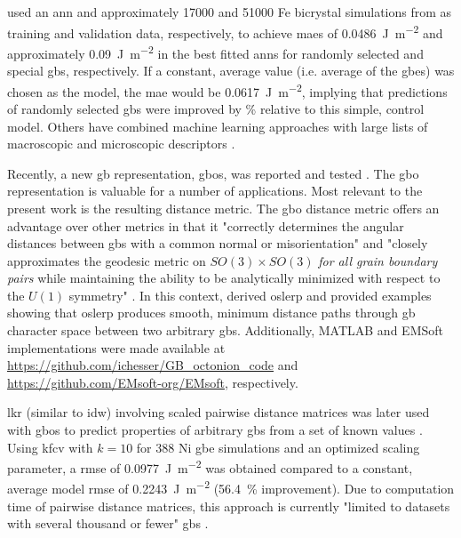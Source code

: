 \documentclass[final,twocolumn,12pt]{elsarticle}
\begin{document}
\citet{restrepoUsingArtificialNeural2014} used an \gls{ann} and approximately \num{17000} and \num{51000} Fe bicrystal simulations from \citet{kimIdentificationSchemeGrain2011} as training and validation data, respectively, to achieve \glspl{mae} of \SI{0.0486}{\J\per\square\m} and approximately \SI{0.09}{\J\per\square\m} in the best fitted \glspl{ann} for randomly selected and special \glspl{gb}, respectively. If a constant, average value (i.e. average of the \inpt{} \glspl{gbe}) was chosen as the model, the \gls{mae} would be \SI{0.0617}{\J\per\square\m}, implying that predictions of randomly selected \glspl{gb} were improved by \% relative to this simple, control model. Others have combined machine learning approaches with large lists of macroscopic and microscopic descriptors \cite{guziewskiMicroscopicMacroscopicCharacterization2021,huGeneticAlgorithmguidedDeep2020}.

Recently, a new \gls{gb} representation, \glspl{gbo}, was reported \cite{francisGeodesicOctonionMetric2019} and tested \cite{chesserLearningGrainBoundary2020}. The \gls{gbo} representation is valuable for a number of applications. Most relevant to the present work is the resulting distance metric. The \gls{gbo} distance metric offers an advantage over other metrics in that it "correctly determines the angular distances between \glspl{gb} with a common normal or misorientation" and "closely approximates the geodesic metric on $SO(3) \times SO(3)$ \textit{for all grain boundary pairs} while maintaining the ability to be analytically minimized with respect to the $U(1)$ symmetry" \cite{francisGeodesicOctonionMetric2019}. In this context, \citet{francisGeodesicOctonionMetric2019} derived \gls{oslerp} and provided examples showing that \gls{oslerp} produces smooth, minimum distance paths through \gls{gb} character space between two arbitrary \glspl{gb}. Additionally, MATLAB and EMSoft implementations were made available at \url{https://github.com/ichesser/GB_octonion_code} and \url{https://github.com/EMsoft-org/EMsoft}, respectively.

\Gls{lkr} (similar to \gls{idw}) involving scaled pairwise distance matrices was later used with \glspl{gbo} to predict properties of arbitrary \glspl{gb} from a set of known values \cite{chesserLearningGrainBoundary2020}. Using \gls{kfcv} with $k=10$ for \num{388} Ni \gls{gbe} simulations \cite{olmstedSurveyComputedGrain2009a} and an optimized scaling parameter, a \gls{rmse} of \SI{0.0977}{\J\per\square\meter} was obtained compared to a constant, average model \gls{rmse} of \SI{0.2243}{\J\per\square\m} (\SI{56.4}{\percent} improvement). Due to computation time of pairwise distance matrices, this approach is currently "limited to datasets with several thousand or fewer" \glspl{gb} \cite{chesserLearningGrainBoundary2020}.
\end{document}
